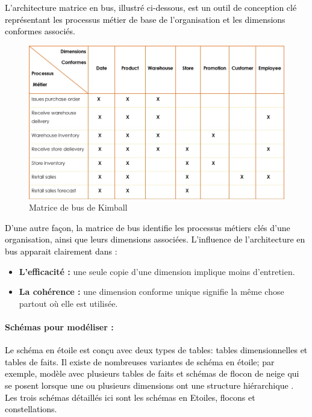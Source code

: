 \documentclass[a4paper,12pt]{report}
\begin{document}
\textcolor{black}{L’architecture matrice en bus, illustré ci-dessous, est un outil de conception clé représentant les processus métier de base de l'organisation et les dimensions conformes associés.}

\begin{figure}[H]
\begin{center}
\includegraphics[width=0.9\linewidth]{./images/14}
\end{center}

\caption{Matrice de bus de Kimball \citep{kimb08bus}}
\label{fig:14}

\end{figure}

\textcolor{black}{D’une autre façon, la matrice de bus identifie les processus métiers clés d'une organisation, ainsi que leurs dimensions associées. L’influence de l’architecture en bus apparait clairement dans :}

\begin{itemize}

\item	\textbf{L’efficacité :} une seule copie d'une dimension  implique moins d'entretien.
\item	 \textbf{La cohérence :} une dimension conforme unique signifie la même chose partout où elle est utilisée.
\end{itemize}


\paragraph{Schémas pour modéliser :}

\textcolor{black}{Le schéma en étoile est conçu avec deux types de tables: tables dimensionnelles et tables de faits. Il existe de nombreuses variantes de schéma en étoile; par exemple, modèle avec plusieurs tables de faits et schémas de flocon de neige qui se posent lorsque une ou plusieurs dimensions ont une structure hiérarchique \citep{hoffer2009modern} .}
\textcolor{black}{Les trois schémas détaillés ici sont les schémas en Etoiles, flocons et constellations.  }
\end{document}
